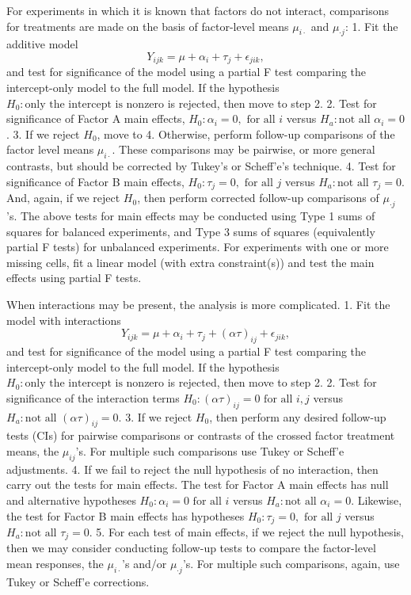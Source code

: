 \documentclass[
]{book}
\begin{document}
For experiments in which it is known that factors do not interact, comparisons for treatments are made on the basis of factor-level means \(\mu_{i\cdot}\) and \(\mu_{\cdot j}\):
1. Fit the additive model
\[Y_{ijk} = \mu+\alpha_i +\tau_j + \epsilon_{jik},\]
and test for significance of the model using a partial F test comparing the intercept-only model to the full model. If the hypothesis \(H_0:\text{only the intercept is nonzero}\) is rejected, then move to step 2.
2. Test for significance of Factor A main effects, \(H_0:\alpha_i = 0, \text{ for all }i\) versus \(H_a:\text{not all }\alpha_i = 0\).
3. If we reject \(H_0\), move to 4. Otherwise, perform follow-up comparisons of the factor level means \(\mu_{i\cdot}\). These comparisons may be pairwise, or more general contrasts, but should be corrected by Tukey's or Scheff'e's technique.
4. Test for significance of Factor B main effects, \(H_0:\tau_j = 0, \text{ for all }j\) versus \(H_a:\text{not all }\tau_j = 0\). And, again, if we reject \(H_0\), then perform corrected follow-up comparisons of \(\mu_{\cdot j}\)'s.
The above tests for main effects may be conducted using Type 1 sums of squares for balanced experiments, and Type 3 sums of squares (equivalently partial F tests) for unbalanced experiments. For experiments with one or more missing cells, fit a linear model (with extra constraint(s)) and test the main effects using partial F tests.

When interactions may be present, the analysis is more complicated.
1. Fit the model with interactions
\[Y_{ijk} = \mu+\alpha_i +\tau_j + (\alpha\tau)_{ij} + \epsilon_{jik},\]
and test for significance of the model using a partial F test comparing the intercept-only model to the full model. If the hypothesis \(H_0:\text{only the intercept is nonzero}\) is rejected, then move to step 2.
2. Test for significance of the interaction terms \(H_0:(\alpha\tau)_{ij} = 0 \text{ for all }i,j\) versus \(H_a:\text{not all }(\alpha\tau)_{ij}=0\).
3. If we reject \(H_0\), then perform any desired follow-up tests (CIs) for pairwise comparisons or contrasts of the crossed factor treatment means, the \(\mu_{ij}\)'s. For multiple such comparisons use Tukey or Scheff'e adjustments.
4. If we fail to reject the null hypothesis of no interaction, then carry out the tests for main effects. The test for Factor A main effects has null and alternative hypotheses \(H_0:\alpha_i = 0 \text{ for all }i\) versus \(H_a:\text{not all }\alpha_i = 0\). Likewise, the test for Factor B main effects has hypotheses \(H_0:\tau_j = 0, \text{ for all }j\) versus \(H_a:\text{not all }\tau_j = 0\).
5. For each test of main effects, if we reject the null hypothesis, then we may consider conducting follow-up tests to compare the factor-level mean responses, the \(\mu_{i\cdot}\)'s and/or \(\mu_{\cdot j}\)'s. For multiple such comparisons, again, use Tukey or Scheff'e corrections.
\end{document}
